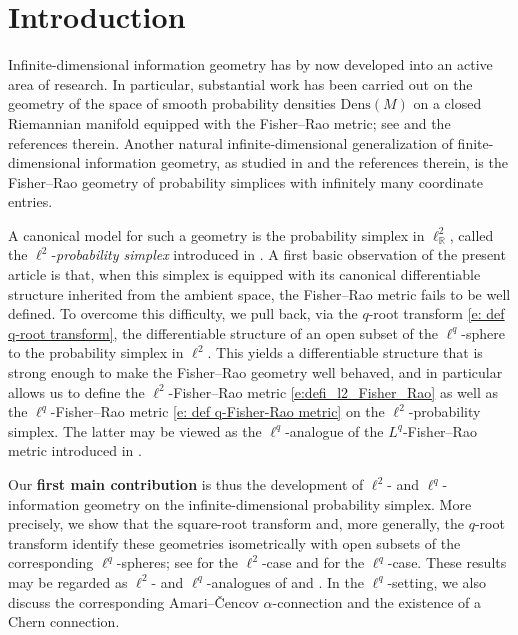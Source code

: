 \documentclass[12pt]{amsart}
\numberwithin{figure}{section}
\numberwithin{table}{section}
\numberwithin{equation}{section}
\begin{document}
\section{Introduction}\label{sec:introduction}
Infinite-dimensional information geometry has by now developed into an active area of research. In particular, substantial work has been carried out on the geometry of the space of smooth probability densities \(\mathrm{Dens}(M)\) on a closed Riemannian manifold equipped with the Fisher--Rao metric; see \cite{FisherRaoisunique,bauerLpFisherRaoMetricAmari2024,khesin_GAFA,khesin_geometry_2019, khesin2024informationgeometrydiffeomorphismgroups} and the references therein. Another natural infinite-dimensional generalization of finite-dimensional information geometry, as studied in \cite{MR1800071,InfGeo_book} and the references therein, is the Fisher--Rao geometry of probability simplices with infinitely many coordinate entries.

A canonical model for such a geometry is the probability simplex in \(\ell^2_{\mathbb{R}}\), called the \(\ell^2\)-\emph{probability simplex} introduced in . A first basic observation of the present article is that, when this simplex is equipped with its canonical differentiable structure inherited from the ambient space, the Fisher--Rao metric fails to be well defined. To overcome this difficulty, we pull back, via the \(q\)-root transform \eqref{e: def q-root transform}, the differentiable structure of an open subset of the \(\ell^q\)-sphere to the probability simplex in \(\ell^2\). This yields a differentiable structure that is strong enough to make the Fisher--Rao geometry well behaved, and in particular allows us to define the \(\ell^2\)-Fisher--Rao metric \eqref{e:defi_l2_Fisher_Rao} as well as the \(\ell^q\)-Fisher--Rao metric \eqref{e: def q-Fisher-Rao metric} on the \(\ell^2\)-probability simplex. The latter may be viewed as the \(\ell^q\)-analogue of the \(L^q\)-Fisher--Rao metric introduced in \cite{bauerLpFisherRaoMetricAmari2024}.

Our \textbf{first main contribution} is thus the development of \(\ell^2\)- and \(\ell^q\)-information geometry on the infinite-dimensional probability simplex. More precisely, we show that the square-root transform and, more generally, the \(q\)-root transform identify these geometries isometrically with open subsets of the corresponding \(\ell^q\)-spheres; see  for the \(\ell^2\)-case and  for the \(\ell^q\)-case. These results may be regarded as \(\ell^2\)- and \(\ell^q\)-analogues of \cite[Thm.~3.1]{khesin_GAFA} and \cite[Thm.~4.10]{bauerLpFisherRaoMetricAmari2024}. In the \(\ell^q\)-setting, we also discuss the corresponding Amari--\v{C}encov \(\alpha\)-connection and the existence of a Chern connection.
\end{document}
